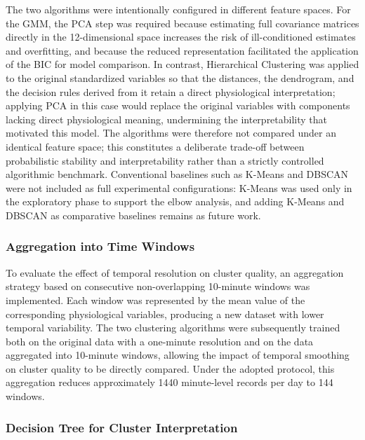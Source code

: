 \documentclass[a4paper,fleqn]{cas-sc}
\newcommand{\newtextorange}[1]{{\color{revorange}#1}}
\newcommand{\newtextteal}[1]{{\color{revteal}#1}}
\begin{document}
\newtextteal{The two algorithms were intentionally configured in different feature spaces. For the GMM, the PCA step was required because estimating full covariance matrices directly in the 12-dimensional space increases the risk of ill-conditioned estimates and overfitting, and because the reduced representation facilitated the application of the BIC for model comparison. In contrast, Hierarchical Clustering was applied to the original standardized variables so that the distances, the dendrogram, and the decision rules derived from it retain a direct physiological interpretation; applying PCA in this case would replace the original variables with components lacking direct physiological meaning, undermining the interpretability that motivated this model. The algorithms were therefore not compared under an identical feature space; this constitutes a deliberate trade-off between probabilistic stability and interpretability rather than a strictly controlled algorithmic benchmark. Conventional baselines such as K-Means and DBSCAN were not included as full experimental configurations: K-Means was used only in the exploratory phase to support the elbow analysis, and adding K-Means and DBSCAN as comparative baselines remains as future work.}

\subsubsection{Aggregation into Time Windows}

To evaluate the effect of temporal resolution on cluster quality, an aggregation strategy based on consecutive non-overlapping 10-minute windows was implemented. Each window was represented by the mean value of the corresponding physiological variables, producing a new dataset with lower temporal variability. The two clustering algorithms were subsequently trained both on the original data with a one-minute resolution and on the data aggregated into 10-minute windows, allowing the impact of temporal smoothing on cluster quality to be directly compared. \newtextorange{Under the adopted protocol, this aggregation reduces approximately 1440 minute-level records per day to 144 windows.}

\subsubsection{Decision Tree for Cluster Interpretation}
\end{document}
